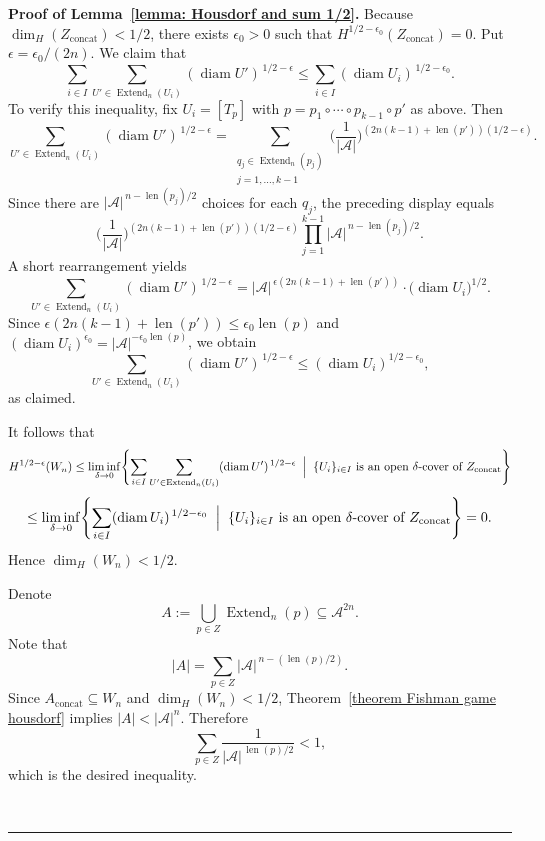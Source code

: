 \documentclass[a4,12pt]{article}%
\newenvironment{proof}[1][Proof]{\textbf{#1.} }{\ \rule{0.5em}{0.5em}}
\begin{document}
\begin{proof}[Proof of Lemma~\ref{lemma: Housdorf and sum 1/2}]
Because \(\dim_H(Z_{\mathrm{concat}})<1/2\), there exists \(\epsilon_0>0\) such that \(H^{1/2-\epsilon_0}(Z_{\mathrm{concat}})=0\). Put \(\epsilon=\epsilon_0/(2n)\). We claim that
\[
\sum_{i\in I}\sum_{U'\in\operatorname{Extend}_n(U_i)}(\operatorname{diam} U')^{\,1/2-\epsilon}
\le
\sum_{i\in I}(\operatorname{diam} U_i)^{\,1/2-\epsilon_0}.
\]
To verify this inequality, fix \(U_i=[T_p]\) with
\(p=p_1\circ\cdots\circ p_{k-1}\circ p'\) as above. Then
\[
\sum_{U'\in\operatorname{Extend}_n(U_i)}(\operatorname{diam} U')^{\,1/2-\epsilon}
=
\sum_{\substack{q_j\in\operatorname{Extend}_n(p_j)\\ j=1,\dots,k-1}}
\biggl(\frac{1}{|\mathcal A|}\biggr)^{(2n(k-1)+\operatorname{len}(p'))(1/2-\epsilon)}.
\]
Since there are \(|\mathcal A|^{\,n-\operatorname{len}(p_j)/2}\) choices for each \(q_j\), the preceding display equals
\[
\biggl(\frac{1}{|\mathcal A|}\biggr)^{(2n(k-1)+\operatorname{len}(p'))(1/2-\epsilon)}
\prod_{j=1}^{k-1} |\mathcal A|^{\,n-\operatorname{len}(p_j)/2}.
\]
A short rearrangement yields
\[
\sum_{U'\in\operatorname{Extend}_n(U_i)}(\operatorname{diam} U')^{\,1/2-\epsilon}
=
|\mathcal A|^{\,\epsilon(2n(k-1)+\operatorname{len}(p'))}\cdot
\bigl(\operatorname{diam} U_i\bigr)^{1/2}.
\]
Since \(\epsilon(2n(k-1)+\operatorname{len}(p'))\le \epsilon_0\operatorname{len}(p)\) and \((\operatorname{diam} U_i)^{\epsilon_0} =  |\mathcal{A}|^{-\epsilon_0 \operatorname{len}(p)} \), we obtain
\[
\sum_{U'\in\operatorname{Extend}_n(U_i)}(\operatorname{diam} U')^{\,1/2-\epsilon}
\le (\operatorname{diam} U_i)^{1/2-\epsilon_0},
\]
as claimed.

It follows that
\[
H^{1/2-\epsilon}(W_n)
\le
\liminf_{\delta\to 0}
\Biggl\{
\sum_{i\in I}\sum_{U'\in\operatorname{Extend}_n(U_i)}(\operatorname{diam} U')^{\,1/2-\epsilon}
\;\Bigm|\;
\{U_i\}_{i\in I}\ \text{is an open }\delta\text{-cover of }Z_{\mathrm{concat}}
\Biggr\}
\]
\[
\le
\liminf_{\delta\to 0}
\Biggl\{
\sum_{i\in I}(\operatorname{diam} U_i)^{\,1/2-\epsilon_0}
\;\Bigm|\;
\{U_i\}_{i\in I}\ \text{is an open }\delta\text{-cover of }Z_{\mathrm{concat}}
\Biggr\}
=0.
\]
Hence \(\dim_H(W_n)<1/2\).

\medskip

Denote
\[
A:=\bigcup_{p\in Z}\operatorname{Extend}_n(p)\subseteq\mathcal A^{2n}.
\]
Note that
\[
|A|=\sum_{p\in Z} |\mathcal A|^{\,n-(\operatorname{len}(p)/2)}.
\]
Since \(A_{\mathrm{concat}}\subseteq W_n \) and \(\dim_H(W_n)<1/2\), Theorem~\ref{theorem Fishman game housdorf} implies \(|A|<|\mathcal A|^n\). Therefore
\[
\sum_{p\in Z} \frac{1}{|\mathcal A|^{\,\operatorname{len}(p)/2}}<1,
\]
which is the desired inequality.


\end{proof}
\end{document}
